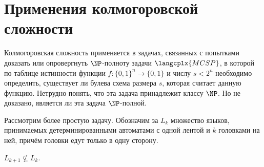 \section{Применения колмогоровской сложности}

Колмогоровская сложность применяется в задачах, связанных с попытками доказать или опровергнуть
$\NP$-полноту задачи $\langcplx{MCSP}$, в которой по таблице истинности функции $f\colon \{0, 1\}^n
\to \{0, 1\}$ и числу $s < 2^n$ необходимо определить, существует ли булева схема размера $s$, которая
считает данную функцию. Нетрудно понять, что эта задача принадлежит классу $\NP$. Но не доказано,
является ли эта задача $\NP$-полной.  

Рассмотрим более простую задачу. Обозначим за $L_k$ множество языков, принимаемых детерминированными
автоматами с одной лентой и $k$ головками на ней, причём головки едут только в одну сторону. 

\begin{proposition}
    $L_{k + 1} \nsubseteq L_{k}$.
\end{proposition}

